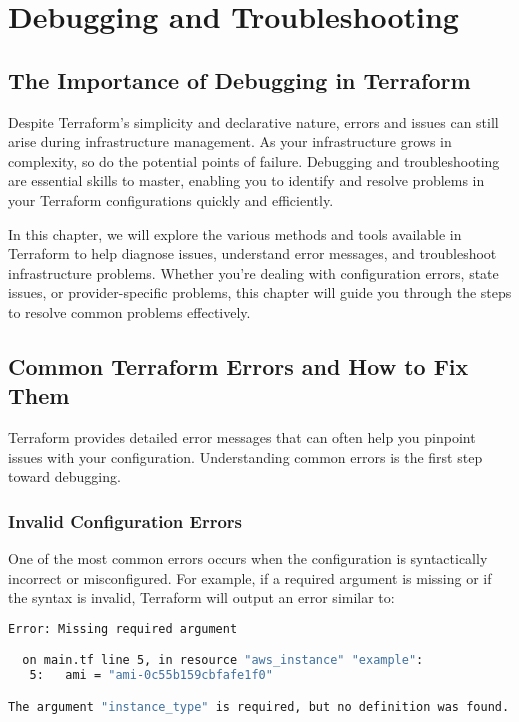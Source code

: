 \chapter{Debugging and Troubleshooting}
\sloppy

\section{The Importance of Debugging in Terraform}

Despite Terraform's simplicity and declarative nature, errors and issues can still arise during infrastructure management. As your infrastructure grows in complexity, so do the potential points of failure. Debugging and troubleshooting are essential skills to master, enabling you to identify and resolve problems in your Terraform configurations quickly and efficiently.

In this chapter, we will explore the various methods and tools available in Terraform to help diagnose issues, understand error messages, and troubleshoot infrastructure problems. Whether you're dealing with configuration errors, state issues, or provider-specific problems, this chapter will guide you through the steps to resolve common problems effectively.

\section{Common Terraform Errors and How to Fix Them}

Terraform provides detailed error messages that can often help you pinpoint issues with your configuration. Understanding common errors is the first step toward debugging.

\subsection{Invalid Configuration Errors}

One of the most common errors occurs when the configuration is syntactically incorrect or misconfigured. For example, if a required argument is missing or if the syntax is invalid, Terraform will output an error similar to:

\begin{lstlisting}[language=bash]
Error: Missing required argument

  on main.tf line 5, in resource "aws_instance" "example":
   5:   ami = "ami-0c55b159cbfafe1f0"

The argument "instance_type" is required, but no definition was found.
\end{lstlisting}

